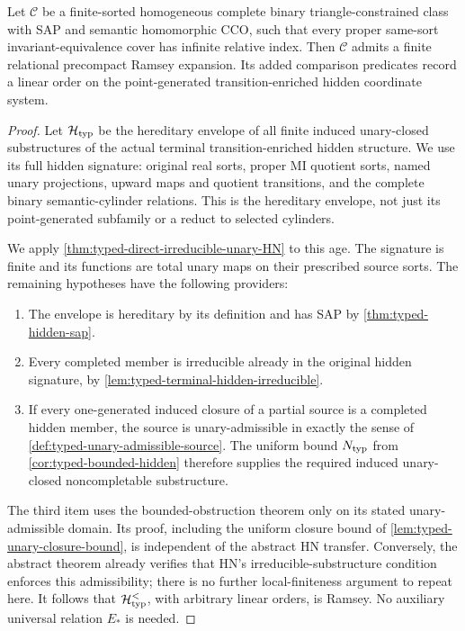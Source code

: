 \begin{theorem}
\label{thm:internal-ramsey-terminal}
Let $\mathcal C$ be a finite-sorted homogeneous complete binary
triangle-constrained class with SAP and semantic homomorphic CCO, such that
every proper same-sort invariant-equivalence cover has infinite relative
index. Then $\mathcal C$ admits a finite relational precompact Ramsey
expansion. Its added comparison predicates record a linear order on the
point-generated transition-enriched hidden coordinate system.
\end{theorem}
\begin{proof}
Let \(\mathcal H_{\rm typ}\) be the hereditary envelope of all
finite induced unary-closed substructures of the actual terminal
transition-enriched hidden structure. We use its full hidden signature:
original real sorts, proper MI quotient sorts, named unary projections,
upward maps and quotient transitions, and the complete binary
semantic-cylinder relations. This is the hereditary envelope, not just
its point-generated subfamily or a reduct to selected cylinders.

We apply \cref{thm:typed-direct-irreducible-unary-HN} to this age.
The signature is finite and its functions are total unary maps on their
prescribed source sorts. The remaining hypotheses have the following
providers:
\begin{enumerate}[label=(\roman*)]
\item The envelope is hereditary by its definition and has SAP by
      \cref{thm:typed-hidden-sap}.
\item Every completed member is irreducible already in the original
      hidden signature, by \cref{lem:typed-terminal-hidden-irreducible}.
\item If every one-generated induced closure of a partial source is a
      completed hidden member, the source is unary-admissible in exactly
      the sense of \cref{def:typed-unary-admissible-source}.
      The uniform bound \(N_{\rm typ}\) from
      \cref{cor:typed-bounded-hidden} therefore supplies the required
      induced unary-closed noncompletable substructure.
\end{enumerate}
The third item uses the bounded-obstruction theorem only on its stated
unary-admissible domain. Its proof, including the uniform closure bound
of \cref{lem:typed-unary-closure-bound}, is independent of the abstract
HN transfer. Conversely, the abstract theorem already verifies that
HN's irreducible-substructure condition enforces this admissibility;
there is no further local-finiteness argument to repeat here.
It follows that \(\mathcal H_{\rm typ}^{<}\), with arbitrary linear
orders, is Ramsey. No auxiliary universal relation \(E_*\) is needed.


\end{proof}
